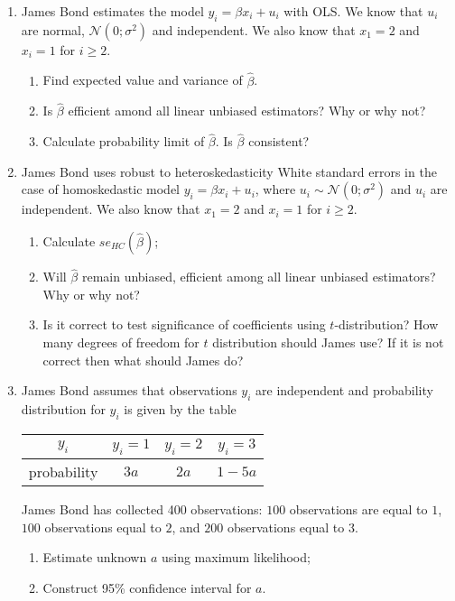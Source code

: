 \documentclass[12pt]{article}
\def \cN{\mathcal{N}}
\begin{document}
\begin{enumerate}

	\item James Bond estimates the model $y_i = \beta x_i + u_i$ with OLS.
	We know that $u_i$ are normal, $\cN(0; \sigma^2)$ and independent.
	We also know that $x_1 = 2$ and $x_i = 1$ for $i\geq 2$.
	    \begin{enumerate}
      \item Find expected value and variance of $\hat \beta$.
      \item Is $\hat \beta$ efficient amond all linear unbiased estimators? Why or why not?
			\item Calculate probability limit of $\hat \beta$. Is $\hat \beta$ consistent?
    \end{enumerate}

  \item James Bond uses robust to heteroskedasticity White standard errors
	in the case of homoskedastic model $y_i = \beta x_i + u_i$, where
	$u_i \sim \cN(0; \sigma^2)$ and $u_i$ are independent.
	We also know that $x_1 = 2$ and $x_i = 1$ for $i\geq 2$.
 \begin{enumerate}
	 \item Calculate $se_{HC}(\hat\beta)$;
 	  \item Will $\hat \beta$ remain unbiased, efficient among all linear unbiased estimators? Why or why not?
		\item Is it correct to test significance of coefficients using $t$-distribution? How many degrees of freedom for $t$ distribution should James use? If it is not correct then what should James do?
 \end{enumerate}

 \item James Bond assumes that observations $y_i$ are independent and probability distribution for $y_i$ is given by the table

	 \begin{tabular}{cccc}
		 \toprule
		 $y_i$ & $y_i = 1$ & $y_i = 2$ & $y_i = 3$ \\
		 \midrule
		 probability & $3a$ & $2a$ & $1 - 5a$ \\
		 \bottomrule
	 \end{tabular}

	 James Bond has collected 400 observations: $100$ observations are equal to $1$, $100$ observations equal to $2$, and $200$ observations equal to $3$.

\begin{enumerate}
 \item Estimate unknown $a$ using maximum likelihood;
 \item Construct 95\% confidence interval for $a$.
\end{enumerate}



\end{enumerate}
\end{document}
